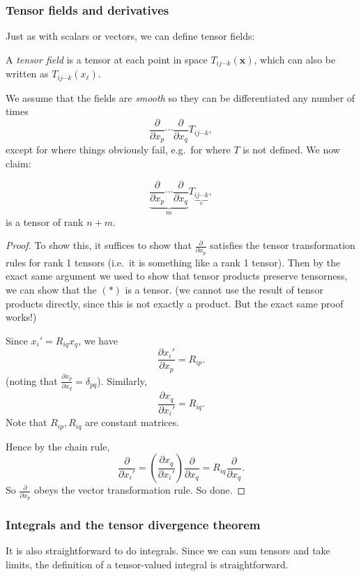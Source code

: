 \documentclass[a4paper]{article}
\begin{document}
\subsubsection*{Tensor fields and derivatives}
Just as with scalars or vectors, we can define tensor fields:
\begin{defi}
  A \emph{tensor field} is a tensor at each point in space $T_{ij\cdots k}(\mathbf{x})$, which can also be written as $T_{ij\cdots k}(x_\ell)$.
\end{defi}

We assume that the fields are \emph{smooth} so they can be differentiated any number of times
\[
  \frac{\partial}{\partial x_p}\cdots \frac{\partial}{\partial x_q}T_{ij\cdots k},
\]
except for where things obviously fail, e.g.\ for where $T$ is not defined. We now claim:
\begin{prop}
  \[
    \underbrace{\frac{\partial}{\partial x_p}\cdots \frac{\partial}{\partial x_q}}_{m}T_{\underbrace{ij\cdots k}_n},\tag{$*$}
  \]
  is a tensor of rank $n + m$.
\end{prop}
\begin{proof}
  To show this, it suffices to show that $\frac{\partial}{\partial x_p}$ satisfies the tensor transformation rules for rank 1 tensors (i.e.\ it is something like a rank 1 tensor). Then by the exact same argument we used to show that tensor products preserve tensorness, we can show that the $(*)$ is a tensor. (we cannot use the result of tensor products directly, since this is not exactly a product. But the exact same proof works!)

  Since $x_i' = R_{iq}x_q$, we have
  \[
    \frac{\partial x_i'}{\partial x_p} = R_{ip}.
  \]
  (noting that $\frac{\partial x_p}{\partial x_q} = \delta_{pq}$). Similarly,
  \[
    \frac{\partial x_q}{\partial x_i'} = R_{iq}.
  \]
  Note that $R_{ip}, R_{iq}$ are constant matrices.

  Hence by the chain rule,
  \[
    \frac{\partial}{\partial x_i'} = \left(\frac{\partial x_q}{\partial x_i'}\right)\frac{\partial}{\partial x_q} = R_{iq} \frac{\partial}{\partial x_q}.
  \]
  So $\frac{\partial}{\partial x_p}$ obeys the vector transformation rule. So done.
\end{proof}
\subsubsection*{Integrals and the tensor divergence theorem}
It is also straightforward to do integrals. Since we can sum tensors and take limits, the definition of a tensor-valued integral is straightforward.
\end{document}
